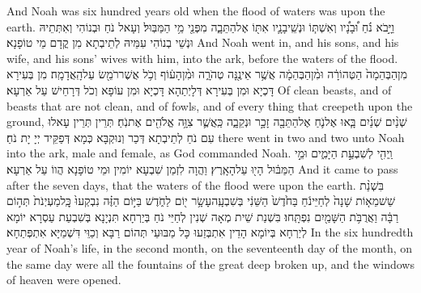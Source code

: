 {And Noah was six hundred years old when the flood of waters was upon the earth.}{}
{וַיָּ֣בֹא נֹ֗חַ וּ֠בָנָ֠יו וְאִשְׁתּ֧וֹ וּנְשֵֽׁי\maqqaf בָנָ֛יו אִתּ֖וֹ אֶל\maqqaf הַתֵּבָ֑ה מִפְּנֵ֖י מֵ֥י הַמַּבּֽוּל׃}
{וְעָאל נֹחַ וּבְנוֹהִי וְאִתְּתֵיהּ וּנְשֵׁי בְנוֹהִי עִמֵּיהּ לְתֵיבְתָא מִן קֳדָם מֵי טוֹפָנָא׃}
{And Noah went in, and his sons, and his wife, and his sons’  wives with him, into the ark, before the waters of the flood.}{}
{מִן\maqqaf הַבְּהֵמָה֙ הַטְּהוֹרָ֔ה וּמִ֨ן\maqqaf הַבְּהֵמָ֔ה אֲשֶׁ֥ר אֵינֶ֖נָּה טְהֹרָ֑ה וּמִ֨ן\maqqaf הָע֔וֹף וְכֹ֥ל אֲשֶׁר\maqqaf רֹמֵ֖שׂ עַל\maqqaf הָֽאֲדָמָֽה׃}
{מִן בְּעִירָא דָּכְיָא וּמִן בְּעִירָא דְּלָיְתַהָא דָּכְיָא וּמִן עוֹפָא וְכֹל דְּרָחֵישׁ עַל אַרְעָא׃}
{Of clean beasts, and of beasts that are not clean, and of fowls, and of every thing that creepeth upon the ground,}{}
{שְׁנַ֨יִם שְׁנַ֜יִם בָּ֧אוּ אֶל\maqqaf נֹ֛חַ אֶל\maqqaf הַתֵּבָ֖ה זָכָ֣ר וּנְקֵבָ֑ה כַּֽאֲשֶׁ֛ר צִוָּ֥ה אֱלֹהִ֖ים אֶת\maqqaf נֹֽחַ׃}
{תְּרֵין תְּרֵין עָאלוּ עִם נֹחַ לְתֵיבְתָא דְּכַר וְנוּקְבָּא כְּמָא דְּפַקֵּיד יְיָ יָת נֹחַ׃}
{there went in two and two unto Noah into the ark, male and female, as God commanded Noah.}{}
{וַֽיְהִ֖י לְשִׁבְעַ֣ת הַיָּמִ֑ים וּמֵ֣י הַמַּבּ֔וּל הָי֖וּ עַל\maqqaf הָאָֽרֶץ׃}
{וַהֲוָה לִזְמַן שִׁבְעָא יוֹמִין וּמֵי טוֹפָנָא הֲווֹ עַל אַרְעָא׃}
{And it came to pass after the seven days, that the waters of the flood were upon the earth.}{}
{בִּשְׁנַ֨ת שֵׁשׁ\maqqaf מֵא֤וֹת שָׁנָה֙ לְחַיֵּי\maqqaf נֹ֔חַ בַּחֹ֙דֶשׁ֙ הַשֵּׁנִ֔י בְּשִׁבְעָֽה\maqqaf עָשָׂ֥ר י֖וֹם לַחֹ֑דֶשׁ בַּיּ֣וֹם הַזֶּ֗ה נִבְקְעוּ֙ כׇּֽל\maqqaf מַעְיְנֹת֙ תְּה֣וֹם רַבָּ֔ה וַאֲרֻבֹּ֥ת הַשָּׁמַ֖יִם נִפְתָּֽחוּ׃}
{בִּשְׁנַת שֵׁית מְאָה שְׁנִין לְחַיֵּי נֹחַ בְּיַרְחָא תִּנְיָנָא בְּשִׁבְעַת עַסְרָא יוֹמָא לְיַרְחָא בְּיוֹמָא הָדֵין אִתְבְּזַעוּ כָּל מַבּוּעֵי תְּהוֹם רַבָּא וְכַוֵּי דִּשְׁמַיָּא אִתְפְּתַחָא׃}
{In the six hundredth year of Noah’s life, in the second month, on the seventeenth day of the month, on the same day were all the fountains of the great deep broken up, and the windows of heaven were opened.}{}
